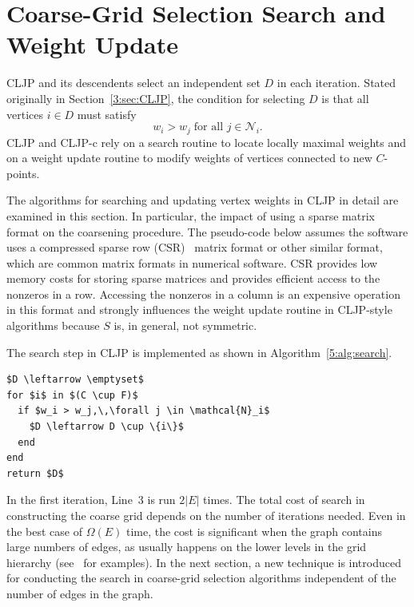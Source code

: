\documentclass{elsart}
\begin{document}
\section{Coarse-Grid Selection Search and Weight Update}
\label{5:sec:s-and-w-update}
CLJP and its descendents select an independent set $D$ in each
iteration. Stated originally in Section~\ref{3:sec:CLJP}, the
condition for selecting $D$ is that all vertices $i \in D$ must
satisfy
\begin{equation}
\label{5:eqn:D-conditions}
w_i > w_j\;\textrm{for all } j \in \mathcal{N}_i.
\end{equation}
CLJP and CLJP-c rely on a search routine to locate locally maximal
weights and on a weight update routine to modify weights of vertices
connected to new $C$-points.

The algorithms for searching and updating vertex weights in CLJP in
detail are examined in this section. In particular, the impact of
using a sparse matrix format on the coarsening procedure. The
pseudo-code below assumes the software uses a compressed sparse row
(CSR)~\cite{saadBook} matrix format or other similar format, which are
common matrix formats in numerical software. CSR provides low memory
costs for storing sparse matrices and provides efficient access to the
nonzeros in a row. Accessing the nonzeros in a column is an expensive
operation in this format and strongly influences the weight update
routine in CLJP-style algorithms because $S$ is, in general, not
symmetric.

The search step in CLJP is implemented as shown in
Algorithm~\ref{5:alg:search}.
\begin{lstlisting}[caption={Coarse-Grid Selection Graph Search},label=5:alg:search]
%\textsc{Search-Graph}$(S,\, C,\, F)$%
$D \leftarrow \emptyset$
for $i$ in $(C \cup F)$
  if $w_i > w_j,\,\forall j \in \mathcal{N}_i$
    $D \leftarrow D \cup \{i\}$
  end
end
return $D$
\end{lstlisting}
In the first iteration, Line~3 is run $2|E|$ times. The total cost of
search in constructing the coarse grid depends on the number of
iterations needed. Even in the best case of $\Omega(E)$ time, the cost
is significant when the graph contains large numbers of edges, as
usually happens on the lower levels in the grid hierarchy
(see~\cite{alber-PCGS} for examples). In the next section, a new
technique is introduced for conducting the search in coarse-grid
selection algorithms independent of the number of edges in the graph.
\end{document}
